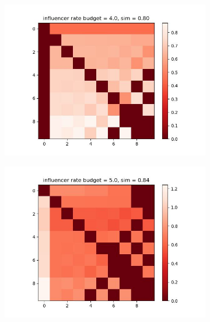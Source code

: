 \documentclass[11pt, letterpaper]{article}
\begin{document}
\begin{figure}[h]
    \centering
\begin{adjustbox}{max width=1.5\textwidth,center}
    \begin{subfigure}[b]{0.45\textwidth}
        \includegraphics[width=\linewidth]{"figures/M_INFL/4.0_heatmap.jpg"}
    \end{subfigure}
    \begin{subfigure}[b]{0.45\textwidth}
        \includegraphics[width=\linewidth]{"figures/M_INFL/5.0_heatmap.jpg"}
    \end{subfigure}
    \begin{subfigure}[b]{0.45\textwidth}

\end{subfigure}
\end{adjustbox}
\end{figure}
\end{document}
